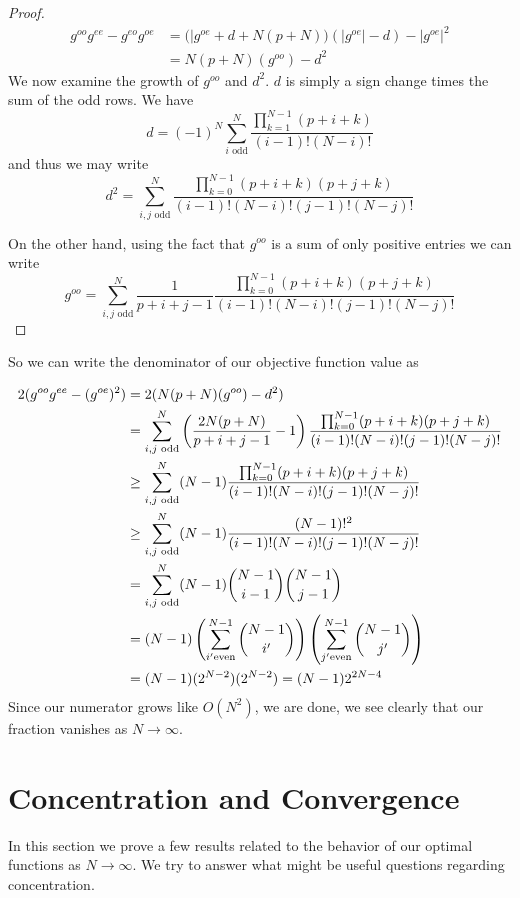 \documentclass[11pt]{article}
\theoremstyle{definition}
\theoremstyle{remark}
\numberwithin{equation}{section}
\begin{document}
\begin{proof}
\begin{align*}
g^{oo} g^{ee} - g^{eo}g^{oe} &=  (|g^{oe} + d + N(p+N)) (|g^{oe}| - d) - |g^{oe}|^2 \\
&= N(p+N)(g^{oo}) - d^2
\end{align*}
We now examine the growth of $g^{oo}$ and $d^2$. $d$ is simply a sign change times the sum of the odd rows. We have
\[d = (-1)^N \sum_{i \text{ odd}}^N \frac{\prod_{k=1}^{N-1} (p+i+k)}{(i-1)!(N-i)!} \] 
and thus we may write 
\[d^2 = \sum_{i,j \text{ odd}}^N 
\frac{\prod_{k=0}^{N-1} (p+i+k)(p+j+k)}{(i-1)! (N-i)! (j-1)! (N-j)!} \]

On the other hand, using the fact that $g^{oo}$ is a sum of only positive entries we can write 
\[g^{oo} = \sum_{i,j \text{ odd}}^N \frac{1}{p+i+j-1} \frac{\prod_{k=0}^{N-1} (p+i+k)(p+j+k)}{(i-1)! (N-i)! (j-1)! (N-j)!}\]
\end{proof} So we can write the denominator of our objective function value as

\begin{align*} 2(g^{oo} g^{ee}-(g^{oe})^2) &= 2(N(p+N)(g^{oo}) - d^2)\\ &= \sum_{i,j \text{ odd}}^N \left( \frac{2N(p+N)}{p+i+j-1} - 1\right) \frac{\prod_{k=0}^{N-1} (p+i+k)(p+j+k)}{(i-1)! (N-i)! (j-1)! (N-j)!} \\
& \ge \sum_{i,j \text{ odd}}^N (N-1) \frac{\prod_{k=0}^{N-1} (p+i+k)(p+j+k)}{(i-1)! (N-i)! (j-1)! (N-j)!}\\
&\ge \sum_{i,j \text{ odd}}^N (N-1) \frac{(N-1)!^2}{(i-1)! (N-i)! (j-1)! (N-j)!} \\
&= \sum_{i,j \text{ odd}}^N (N-1) \dbinom{N-1}{i-1} \dbinom{N-1}{j-1}\\
&= (N-1) \left(\sum_{i' \text{even}}^{N-1} \dbinom{N-1}{i'}\right) \left( \sum_{j' \text{even}}^{N-1} \dbinom{N-1}{j'}\right)\\
&= (N-1)(2^{N-2})(2^{N-2}) = (N-1)2^{2N-4}
\end{align*} 
Since our numerator grows like $O(N^2)$, we are done, we see clearly that our fraction vanishes as $N \to \infty$.

\section{Concentration and Convergence}

In this section we prove a few results related to the behavior of our optimal functions as $N\to \infty$. We try to answer what might be useful questions regarding concentration. 
\end{document}
